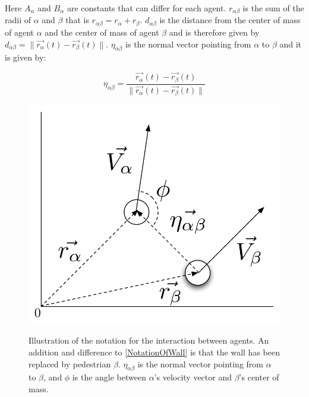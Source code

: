 Here $A_{\alpha}$ and $B_{\alpha}$ are constants that can differ for each agent. 
$r_{\alpha \beta}$ is the sum of the radii of $\alpha$ and $\beta$ that is 
$r_{\alpha \beta} = r_{\alpha} + r_{\beta}$. $d_{\alpha \beta}$ is the 
distance from the center of mass of agent $\alpha$ and the center of mass of 
agent $\beta$ and is therefore given by $d_{\alpha \beta} = 
\|\vec{r_{\alpha}}\left( t \right) - \vec{r_{\beta}}\left( t \right) \|$.
$\eta_{\alpha \beta}$ is the normal vector pointing from $\alpha$ to $\beta$ 
and it is given by:

\begin{equation}
    \eta_{\alpha \beta} =
        \frac{\vec{r_{\alpha}}(t) - \vec{r_{\beta}}(t)}
             {\|\vec{r_{\alpha}}(t) - \vec{r_{\beta}}(t) \|}
\end{equation}

\begin{figure}[ht]
    \centering
    {\includegraphics[scale=0.35]{Figures/NotationOfInteraction.pdf}} 
    \caption[Notation of the interaction between two agents]{Illustration of the notation for the interaction between agents.
	     An addition and difference to \ref{NotationOfWall} is that the wall has been replaced by pedestrian $\beta$.
	     $\eta_{\alpha \beta}$ is the normal vector pointing from $\alpha$ to $\beta$, and $\phi$ is the angle between $\alpha$'s 
	     velocity vector and $\beta$'s center of mass.}
    \label{fig:NotationOfInteraction}
\end{figure}


